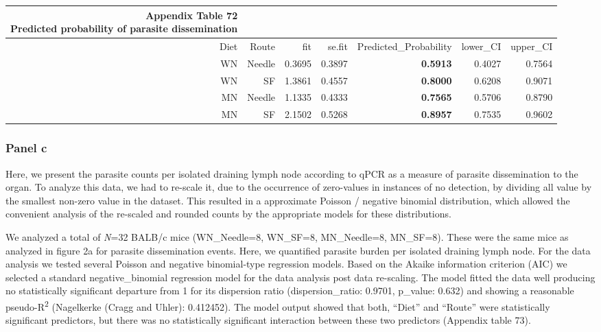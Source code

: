 \documentclass[
  12pt,
  letterpaper,
]{article}
\begin{document}
\begin{longtable}{rrrrrrr}
\caption*{
{\large \textbf{Appendix Table 72}} \\ 
{\small \textbf{Predicted probability of parasite dissemination}}
} \\ 
\toprule
Diet & Route & fit & se.fit & Predicted\_Probability & lower\_CI & upper\_CI \\ 
\midrule\addlinespace[2.5pt]
WN & Needle & 0.3695 & 0.3897 & \textbf{0.5913} & 0.4027 & 0.7564 \\ 
WN & SF & 1.3861 & 0.4557 & \textbf{0.8000} & 0.6208 & 0.9071 \\ 
MN & Needle & 1.1335 & 0.4333 & \textbf{0.7565} & 0.5706 & 0.8790 \\ 
MN & SF & 2.1502 & 0.5268 & \textbf{0.8957} & 0.7535 & 0.9602 \\ 
\bottomrule
\end{longtable}

\subsubsection{Panel c}\label{panel-c}

Here, we present the parasite counts per isolated draining lymph node according to qPCR as a measure of parasite dissemination to the organ. To analyze this data, we had to re-scale it, due to the occurrence of zero-values in instances of no detection, by dividing all value by the smallest non-zero value in the dataset. This resulted in a approximate Poisson / negative binomial distribution, which allowed the convenient analysis of the re-scaled and rounded counts by the appropriate models for these distributions.

We analyzed a total of \emph{N}=32 BALB/c mice (WN\_Needle=8, WN\_SF=8, MN\_Needle=8, MN\_SF=8). These were the same mice as analyzed in figure 2a for parasite dissemination events. Here, we quantified parasite burden per isolated draining lymph node. For the data analysis we tested several Poisson and negative binomial-type regression models. Based on the Akaike information criterion (AIC) we selected a standard negative\_binomial regression model for the data analysis post data re-scaling. The model fitted the data well producing no statistically significant departure from 1 for its dispersion ratio (dispersion\_ratio: 0.9701, p\_value: 0.632) and showing a reasonable pseudo-R\textsuperscript{2} (Nagelkerke (Cragg and Uhler): 0.412452). The model output showed that both, ``Diet'' and ``Route'' were statistically significant predictors, but there was no statistically significant interaction between these two predictors (Appendix table 73).
\end{document}
